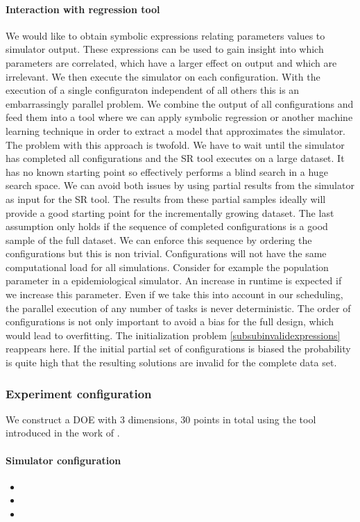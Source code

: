 \paragraph{Interaction with regression tool}
We would like to obtain symbolic expressions relating parameters values to simulator output. These expressions can be used to gain insight into which parameters are correlated, which have a larger effect on output and which are irrelevant. 
We then execute the simulator on each configuration. With the execution of a single configuraton independent of all others this is an embarrassingly parallel problem. We combine the output of all configurations and feed them into a tool where we can apply symbolic regression or another machine learning technique in order to extract a model that approximates the simulator. The problem with this approach is twofold. We have to wait until the simulator has completed all configurations and the SR tool executes on a large dataset. It has no known starting point so effectively performs a blind search in a huge search space. We can avoid both issues by using partial results from the simulator as input for the SR tool. The results from these partial samples ideally will provide a good starting point for the incrementally growing dataset. The last assumption only holds if the sequence of completed configurations is a good sample of the full dataset. We can enforce this sequence by ordering the configurations but this is non trivial. Configurations will not have the same computational load for all simulations. Consider for example the population parameter in a epidemiological simulator. An increase in runtime is expected if we increase this parameter. Even if we take this into account in our scheduling, the parallel execution of any number of tasks is never deterministic. The order of configurations is not only important to avoid a bias for the full design, which would lead to overfitting. The initialization problem \ref{subsubinvalidexpressions} reappears here. If the initial partial set of configurations is biased the probability is quite high that the resulting solutions are invalid for the complete data set. 

\subsubsection{Experiment configuration}
We construct a DOE with 3 dimensions, 30 points in total using the tool introduced in the work of \citep{DOE}. %
\paragraph{Simulator configuration}
\begin{itemize}
\item 
\item 
\item 
\end{itemize}
